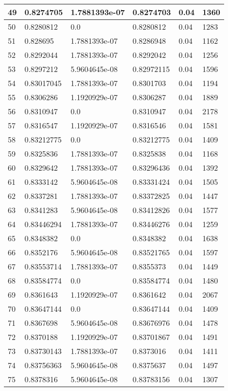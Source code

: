 \begin{longtable}{|l|l|l|l|l|l|}
49 & 0.8274705 & 1.7881393e-07 & 0.8274703 & 0.04 & 1360 \\ \hline 
50 & 0.8280812 & 0.0 & 0.8280812 & 0.04 & 1283 \\ \hline 
51 & 0.828695 & 1.7881393e-07 & 0.8286948 & 0.04 & 1162 \\ \hline 
52 & 0.8292044 & 1.7881393e-07 & 0.8292042 & 0.04 & 1256 \\ \hline 
53 & 0.8297212 & 5.9604645e-08 & 0.82972115 & 0.04 & 1596 \\ \hline 
54 & 0.83017045 & 1.7881393e-07 & 0.8301703 & 0.04 & 1194 \\ \hline 
55 & 0.8306286 & 1.1920929e-07 & 0.8306287 & 0.04 & 1889 \\ \hline 
56 & 0.8310947 & 0.0 & 0.8310947 & 0.04 & 2178 \\ \hline 
57 & 0.8316547 & 1.1920929e-07 & 0.8316546 & 0.04 & 1581 \\ \hline 
58 & 0.83212775 & 0.0 & 0.83212775 & 0.04 & 1409 \\ \hline 
59 & 0.8325836 & 1.7881393e-07 & 0.8325838 & 0.04 & 1168 \\ \hline 
60 & 0.8329642 & 1.7881393e-07 & 0.83296436 & 0.04 & 1392 \\ \hline 
61 & 0.8333142 & 5.9604645e-08 & 0.83331424 & 0.04 & 1505 \\ \hline 
62 & 0.8337281 & 1.7881393e-07 & 0.83372825 & 0.04 & 1447 \\ \hline 
63 & 0.8341283 & 5.9604645e-08 & 0.83412826 & 0.04 & 1577 \\ \hline 
64 & 0.83446294 & 1.7881393e-07 & 0.83446276 & 0.04 & 1259 \\ \hline 
65 & 0.8348382 & 0.0 & 0.8348382 & 0.04 & 1638 \\ \hline 
66 & 0.8352176 & 5.9604645e-08 & 0.83521765 & 0.04 & 1597 \\ \hline 
67 & 0.83553714 & 1.7881393e-07 & 0.8355373 & 0.04 & 1449 \\ \hline 
68 & 0.83584774 & 0.0 & 0.83584774 & 0.04 & 1480 \\ \hline 
69 & 0.8361643 & 1.1920929e-07 & 0.8361642 & 0.04 & 2067 \\ \hline 
70 & 0.83647144 & 0.0 & 0.83647144 & 0.04 & 1409 \\ \hline 
71 & 0.8367698 & 5.9604645e-08 & 0.83676976 & 0.04 & 1478 \\ \hline 
72 & 0.8370188 & 1.1920929e-07 & 0.83701867 & 0.04 & 1491 \\ \hline 
73 & 0.83730143 & 1.7881393e-07 & 0.8373016 & 0.04 & 1411 \\ \hline 
74 & 0.83756363 & 5.9604645e-08 & 0.8375637 & 0.04 & 1497 \\ \hline 
75 & 0.8378316 & 5.9604645e-08 & 0.83783156 & 0.04 & 1307 \\ \hline 
\end{longtable}